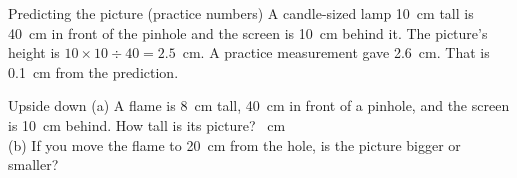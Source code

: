 \begin{worked}{Predicting the picture (practice numbers)}
A candle-sized lamp 10~cm tall is 40~cm in front of the pinhole and the screen is 10~cm behind it. The picture's height is $10\times10\div40=2.5$~cm. A practice measurement gave 2.6~cm. That is 0.1~cm from the prediction.
\end{worked}

\begin{puzzle}{Upside down}
(a) A flame is 8~cm tall, 40~cm in front of a pinhole, and the screen is 10~cm behind. How tall is its picture? \wline[1.6cm]~cm\\
(b) If you move the flame to 20~cm from the hole, is the picture bigger or smaller? \wline[2cm]
\end{puzzle}
\clearpage
